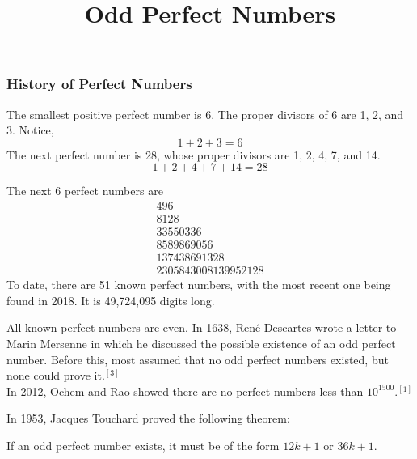 \documentclass[12pt]{beamer}
\begin{document}
\begin{frame}
\frametitle{History of Perfect Numbers}
The smallest positive perfect number is 6. The proper divisors of 6 are 1, 2, and 3. Notice, $$1+2+3=6$$
The next perfect number is 28, whose proper divisors are 1, 2, 4, 7, and 14.
$$1+2+4+7+14=28$$
\end{frame}	

\begin{frame}
The next 6 perfect numbers are
 $$\begin{array}{r}
496\\
8128\\
33550336\\
8589869056\\
137438691328\\
2305843008139952128
\end{array}$$
To date, there are 51 known perfect numbers, with the most recent one being found in 2018. It is 49,724,095 digits long.
\end{frame}		
	
\begin{frame}
\title{Odd Perfect Numbers}
All known perfect numbers are even. In 1638, René Descartes wrote a letter to Marin Mersenne in which he discussed the possible existence of an odd perfect number. Before this, most assumed that no odd perfect numbers existed, but none could prove it.$^{[3]}$ \\
In 2012, Ochem and Rao showed there are no perfect numbers less than $10^{1500}$.$^{[1]}$ \\
\end{frame}	
	
\begin{frame}
In 1953, Jacques Touchard proved the following theorem:
\begin{theorem}
If an odd perfect number exists, it must be of the form $12k+1$ or $36k+1$. 
\end{theorem} 
\end{frame}
\end{document}
